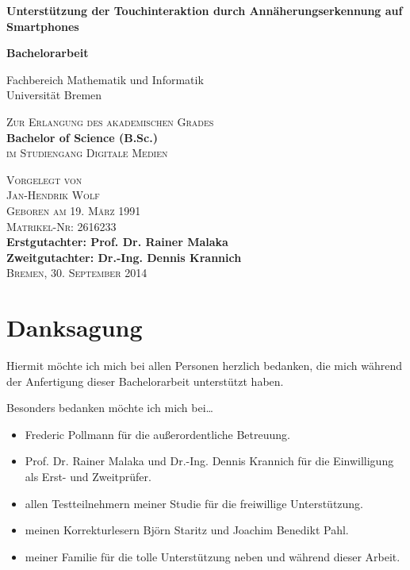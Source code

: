 \documentclass[12pt,numbers=noenddot,parskip,bibliography=totocnumbered,listof=totocnumbered]{scrreprt}
\begin{document}
\begin{titlepage}
\begin{center}
\null
\vfill
\LARGE\textsf{\textbf{Unterstützung der Touchinteraktion durch Annäherungserkennung auf Smartphones}}

\vfill
\LARGE\textrm{\textbf{Bachelorarbeit}}

\large\textrm{Fachbereich Mathematik und Informatik\\
\vspace{.5em}
Universität Bremen}

\vfill
\large\textsc{Zur Erlangung des akademischen Grades}\\
\vspace{.75em}
\textbf{Bachelor of Science (B.Sc.)}\\
\vspace{.75em}
\textsc{im Studiengang Digitale Medien}

\vfill\small\textsc{
Vorgelegt von\\
Jan-Hendrik Wolf\\
Geboren am 19. März 1991\\
Matrikel-Nr: 2616233}\\
\vspace{1cm}
\small\textbf{Erstgutachter:  Prof. Dr. Rainer Malaka\\
Zweitgutachter: Dr.-Ing. Dennis Krannich}\\
\vspace{1cm}
\small\textsc{Bremen, 30. September 2014}
\end{center}
\end{titlepage}

\chapter*{Danksagung}
Hiermit möchte ich mich bei allen Personen herzlich bedanken, die mich während der Anfertigung dieser Bachelorarbeit unterstützt haben.

Besonders bedanken möchte ich mich bei\dots
\begin{itemize}
\item Frederic Pollmann für die außerordentliche Betreuung.
\item Prof. Dr. Rainer Malaka und Dr.-Ing. Dennis Krannich für die Einwilligung als Erst- und Zweitprüfer.
\item allen Testteilnehmern meiner Studie für die freiwillige Unterstützung.
\item meinen Korrekturlesern Björn Staritz und Joachim Benedikt Pahl.
\item meiner Familie für die tolle Unterstützung neben und während dieser Arbeit.
\end{itemize}
\end{document}
